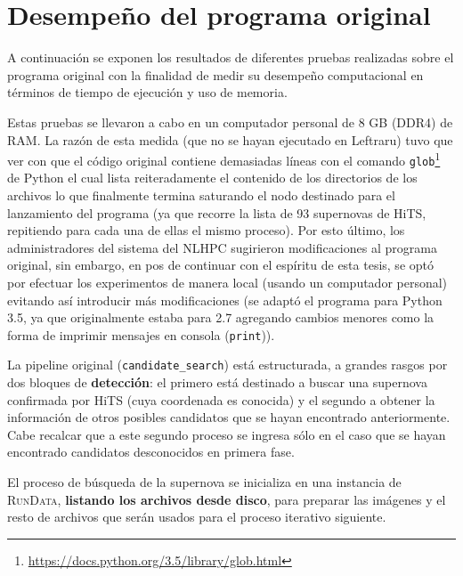 \chapter{Desempe\~no del programa original}
\label{ch:prev_work}

A continuaci\'on se exponen los resultados de diferentes pruebas realizadas sobre el programa original con la finalidad de medir su desempe\~no computacional en t\'erminos de tiempo de ejecuci\'on y uso de memoria.
\bigskip

Estas pruebas se llevaron a cabo en un computador personal de 8 GB (DDR4) de RAM. La raz\'on de esta  medida (que no se hayan ejecutado en Leftraru) tuvo que ver con que el c\'odigo original contiene demasiadas l\'ineas con el comando \texttt{glob}\footnote{\url{https://docs.python.org/3.5/library/glob.html}} de Python el cual lista reiteradamente el contenido de los directorios de los archivos lo que finalmente termina saturando el nodo destinado para el lanzamiento del programa (ya que recorre la lista de 93 supernovas de HiTS, repitiendo para cada una de ellas el mismo proceso). Por esto \'ultimo, los administradores del sistema del NLHPC sugirieron modificaciones al programa original, sin embargo, en pos de continuar con el esp\'iritu de esta tesis, se opt\'o por efectuar los experimentos de manera local (usando un computador personal) evitando as\'i introducir m\'as modificaciones (se adapt\'o el programa para Python 3.5, ya que originalmente estaba para 2.7 agregando cambios menores como la forma de imprimir mensajes en consola (\texttt{print})).
\bigskip

La pipeline original (\texttt{candidate\_search}) est\'a estructurada, a grandes rasgos por dos bloques de \textbf{detecci\'on}: el primero est\'a destinado a buscar una supernova confirmada por HiTS (cuya coordenada es conocida) y el segundo a obtener la informaci\'on de otros posibles candidatos que se hayan encontrado anteriormente. Cabe recalcar que a este segundo proceso se ingresa s\'olo en el caso que se hayan encontrado candidatos desconocidos en primera fase.
\bigskip

El proceso de b\'usqueda de la supernova se inicializa en una instancia de \textsc{RunData}, \textbf{listando los archivos desde disco}, para preparar las im\'agenes y el resto de archivos que ser\'an usados para el proceso iterativo siguiente. 


